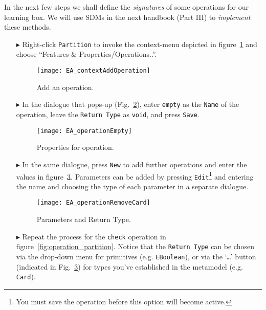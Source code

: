In the next few steps we shall define the \emph{signatures} of some operations for our learning box. We will use SDMs in the next handbook (Part III) to \emph{implement} these methods.
\begin{enumerate}
\item[$\blacktriangleright$] Right-click \texttt{Partition} to invoke the context-menu depicted in figure~\ref{fig:add_operation} and choose ``Features \& Properties/Operations..''.

\begin{figure}[htbp]
	\centering
  \texttt{[image: EA\_contextAddOperation]}
	\caption{Add an operation.}
	\label{fig:add_operation}
\end{figure}
\FloatBarrier

\item[$\blacktriangleright$] In the dialogue that pops-up (Fig.~\ref{fig:operation_properties}), enter \texttt{empty} as the \texttt{Name} of the operation, leave the \texttt{Return Type} as \texttt{void}, and press \texttt{Save}.

\begin{figure}[htbp]
	\centering
  	\texttt{[image: EA\_operationEmpty]}
	\caption{Properties for operation.}
	\label{fig:operation_properties}
\end{figure}
\FloatBarrier

\item[$\blacktriangleright$] In the same dialogue, press \texttt{New} to add further operations and enter the values in figure~\ref{fig:operation_parameters}.  Parameters can be added by pressing \texttt{Edit}\footnote{You must save the operation before this option will become active.} and entering the name and choosing the type of each parameter in a separate dialogue.

\begin{figure}[htbp]
	\centering
  \texttt{[image: EA\_operationRemoveCard]}
	\caption{Parameters and Return Type.}
	\label{fig:operation_parameters}
\end{figure}
\FloatBarrier

\vfill
\pagebreak

\item[$\blacktriangleright$] Repeat the process for the \texttt{check} operation in figure~\ref{fig:operation_partition}.
Notice that the \texttt{Return Type} can be chosen via the drop-down menu for primitives (e.g. \texttt{EBoolean}), or via the `\texttt{\ldots}' button (indicated in Fig.~\ref{fig:operation_parameters}) for types you've established in the metamodel (e.g. \texttt{Card}).
\end{enumerate}

